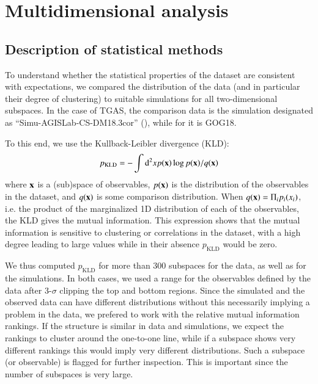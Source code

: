 
\section{Multidimensional analysis}\label{multidim}

\subsection{Description of statistical methods}\label{sec:stat}

To understand whether the statistical properties of the {} dataset
are consistent with expectations, we compared the distribution of the data  
(and in particular their degree of clustering) to suitable simulations 
for all two-dimensional subspaces. In the case of
TGAS, the comparison data is the simulation designated as
``Simu-AGISLab-CS-DM18.3cor'' (), while for {} it is GOG18. 

To this end, we use the Kullback-Leibler divergence (KLD):
\begin{equation}
\label{eqn:KLD_wp945}
p_\mathrm{KLD} = -\int {\rm d}^2 x p({\bf x}) \log p({\bf x})/q({\bf x})
\end{equation}
where ${\bf x}$ is a (sub)space of observables, $p({\bf x})$ is the
distribution of the observables in the dataset, and $q({\bf x})$ is
some comparison distribution. When $q({\bf x}) = \Pi_i p_i(x_i)$,
i.e. the product of the marginalized 1D distribution of each of the
observables, the KLD gives the mutual information. This expression
shows that the mutual information is sensitive to clustering or
correlations in the dataset, with a high degree leading to large values
while in their absence $p_\mathrm{KLD}$ would be zero.

We thus computed $p_\mathrm{KLD}$ for more than 300 subspaces for the
data, as well as for the simulations. In both cases, we used a range
for the observables defined by the data after 3-$\sigma$ clipping the
top and bottom regions. Since the simulated and the observed data can
have different distributions without this necessarily implying a
problem in the data, we prefered to work with the relative mutual information rankings. If
the structure is similar in data and simulations, we expect the
rankings to cluster around the one-to-one line, while if a subspace
shows very different rankings this would imply very
different distributions. Such a subspace (or observable) is flagged
for further inspection. This is important since the number of
subspaces is very large.

